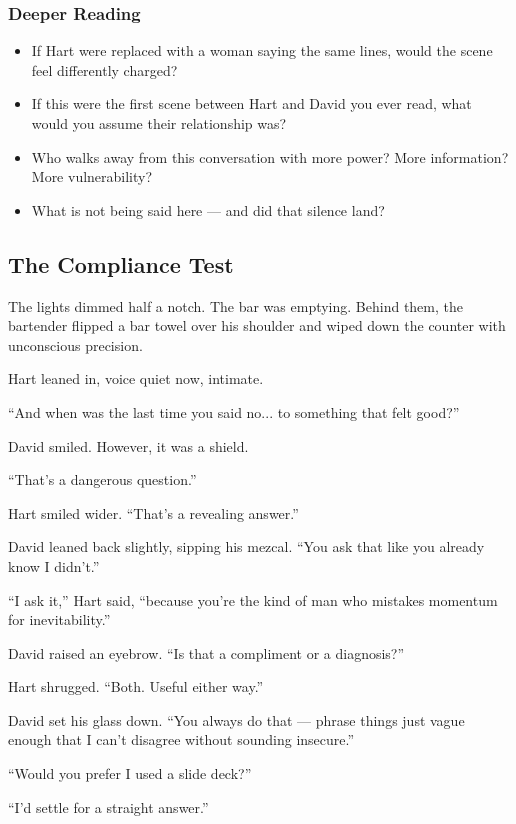 \subsubsection*{Deeper Reading}
\begin{itemize}
    \item If Hart were replaced with a woman saying the same lines, would the scene feel differently charged?
    \item If this were the first scene between Hart and David you ever read, what would you assume their relationship was?
    \item Who walks away from this conversation with more power? More information? More vulnerability?
    \item What is not being said here — and did that silence land?
\end{itemize}


\subsection{The Compliance Test}


The lights dimmed half a notch. The bar was emptying. Behind them, the bartender flipped a bar towel over his 
shoulder and wiped down the counter with unconscious precision.

Hart leaned in, voice quiet now, intimate.

``And when was the last time you said no... to something that felt good?''

David smiled. However, it was a shield.

``That’s a dangerous question.''

Hart smiled wider. ``That’s a revealing answer.''

David leaned back slightly, sipping his mezcal. ``You ask that like you already know I didn’t.''

``I ask it,'' Hart said, ``because you’re the kind of man who mistakes momentum for inevitability.''

David raised an eyebrow. ``Is that a compliment or a diagnosis?''

Hart shrugged. ``Both. Useful either way.''

David set his glass down. ``You always do that — phrase things just vague enough that I can't disagree without 
sounding insecure.''

``Would you prefer I used a slide deck?''

``I’d settle for a straight answer.''

